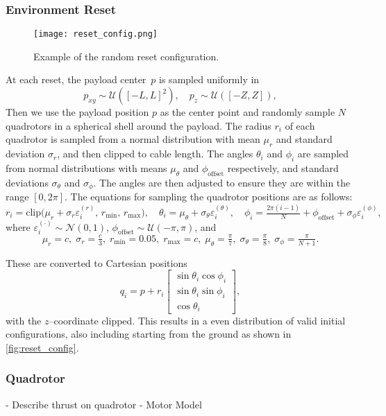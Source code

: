 \subsubsection{Environment Reset}
\begin{figure}
    \centering
    \texttt{[image: reset\_config.png]}
    \caption{Example of the random reset configuration.}
    \label{fig:reset_config}
\end{figure}
At each reset, the payload center~$p$ is sampled uniformly in
\[
p_{xy}\sim\mathcal{U}([-L,L]^2),\quad p_z\sim\mathcal{U}([-Z,Z]),
\]
Then we use the payload position $p$ as the center point and randomly sample $N$ quadrotors in a spherical shell around the payload. The radius $r_i$ of each quadrotor is sampled from a normal distribution with mean $\mu_r$ and standard deviation $\sigma_r$, and then clipped to cable length. The angles $\theta_i$ and $\phi_i$ are sampled from normal distributions with means $\mu_\theta$ and $\phi_{\mathrm{offset}}$ respectively, and standard deviations $\sigma_\theta$ and $\sigma_\phi$. The angles are then adjusted to ensure they are within the range $[0, 2\pi]$. The equations for sampling the quadrotor positions are as follows:
\[
r_i = \mathrm{clip}\bigl(\mu_r+\sigma_r\varepsilon_i^{(r)},\,r_{\min},\,r_{\max}\bigr),\quad
\theta_i = \mu_\theta+\sigma_\theta\varepsilon_i^{(\theta)},\quad
\phi_i = \tfrac{2\pi(i-1)}{N} + \phi_{\mathrm{offset}} + \sigma_\phi\varepsilon_i^{(\phi)},
\]
where $\varepsilon_i^{(\cdot)}\!\sim\mathcal{N}(0,1)$, $\phi_{\mathrm{offset}}\!\sim\mathcal{U}(-\pi,\pi)$, and
\[
\mu_r=c,\;\sigma_r=\tfrac{c}{3},\;r_{\min}=0.05,\;r_{\max}=c,\;
\mu_\theta=\tfrac{\pi}{7},\;\sigma_\theta=\tfrac{\pi}{8},\;\sigma_\phi=\tfrac{\pi}{N+1}.
\]

These are converted to Cartesian positions
\[
q_i = p + r_i
\begin{bmatrix}
\sin\theta_i\cos\phi_i\\
\sin\theta_i\sin\phi_i\\
\cos\theta_i
\end{bmatrix},
\]
with the $z$–coordinate clipped. 
This results in a even distribution of valid initial configurations, also including starting from the ground as shown in \autoref{fig:reset_config}. 





\subsubsection{Quadrotor}
- Describe thrust on quadrotor
- Motor Model

